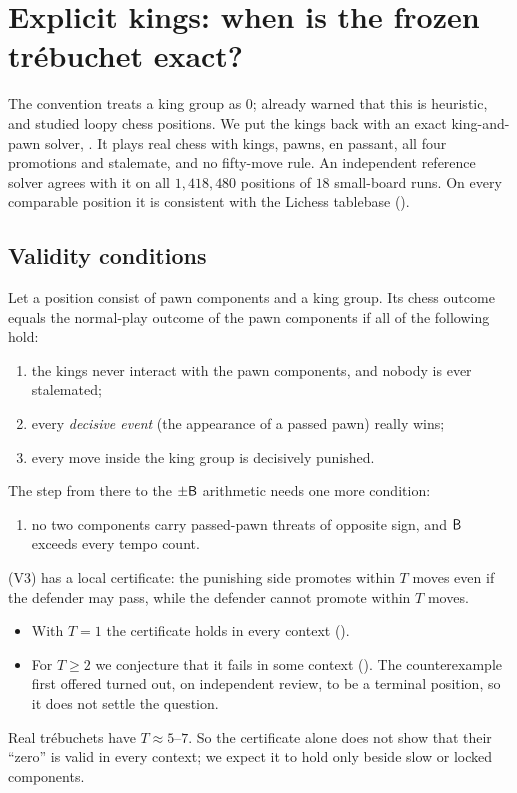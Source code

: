 \section{Explicit kings: when is the frozen tr\'ebuchet exact?}\label{sec:kings}

The convention treats a king group as $0$; \citet{Maeser2002} already warned that this is heuristic, and \citet{Siegel2009cycles} studied loopy chess positions. We put the kings back with an exact king-and-pawn solver,
. It plays real chess with kings, pawns, en passant, all four promotions and stalemate, and no
fifty-move rule. An independent reference solver agrees with it on all $1{,}418{,}480$ positions of $18$
small-board runs. On every comparable position it is consistent with the Lichess tablebase
().

\subsection{Validity conditions}
\begin{theorem}\label{thm:validity}
Let a position consist of pawn components and a king group. Its chess outcome equals the normal-play outcome
of the pawn components if all of the following hold:
\begin{enumerate}[label=(V\arabic*)]
\item the kings never interact with the pawn components, and nobody is ever stalemated;
\item every \emph{decisive event} (the appearance of a passed pawn) really wins;
\item every move inside the king group is decisively punished.
\end{enumerate}
The step from there to the $\pm\mathsf{B}$ arithmetic needs one more condition:
\begin{enumerate}[label=(V\arabic*),resume]
\item no two components carry passed-pawn threats of opposite sign, and $\mathsf{B}$ exceeds every tempo count.
\end{enumerate}
\end{theorem}
(V3) has a local certificate: the punishing side promotes within $T$ moves even if the defender may pass,
while the defender cannot promote within $T$ moves.
\begin{itemize}
\item With $T=1$ the certificate holds in every context ().
\item For $T\ge2$ we conjecture that it fails in some context (). The counterexample
  first offered turned out, on independent review, to be a terminal position, so it does not settle the
  question.
\end{itemize}
Real tr\'ebuchets have $T\approx5$--$7$. So the certificate alone does not show that their ``zero'' is valid in every context; we expect it to hold only beside slow or locked components.

